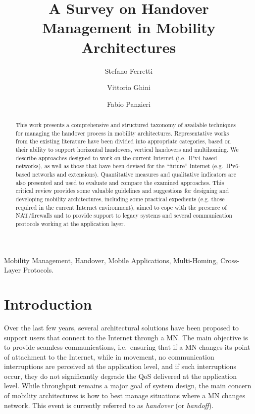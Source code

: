 \documentclass[preprint,12pt]{elsarticle}
\begin{document}
\begin{frontmatter}

\title{A Survey on Handover Management in Mobility Architectures}

\author{Stefano Ferretti}

\author{Vittorio Ghini}

\author{Fabio Panzieri}

\address{Department of Computer Science and Engineering, University of Bologna\\ Mura Anteo 
Zamboni 7, 40127 Bologna, Italy}

\begin{abstract}
This work presents a comprehensive and structured taxonomy of  available techniques for managing the handover process in mobility architectures. 
Representative works from the existing literature have been divided into appropriate categories, based on their ability to support horizontal handovers, vertical handovers and 
multihoming. We describe approaches designed to work on the current Internet (i.e.~IPv4-based 
networks), as well as those that have been devised for the ``future'' Internet 
(e.g.~IPv6-based networks and extensions). 
Quantitative measures and qualitative indicators are 
also presented and used to evaluate and compare the examined approaches.
This critical review provides some valuable guidelines and suggestions for designing and developing mobility architectures,  
including some practical expedients (e.g. those required in the current Internet environment), aimed to cope with the presence of NAT/firewalls and to provide support to legacy systems and several communication protocols working at the application layer.
\end{abstract}

\begin{keyword}
Mobility Management, Handover, Mobile Applications, Multi-Homing, Cross-Layer Protocols.
\end{keyword}

\end{frontmatter}

\section{Introduction}

Over the last few years, several architectural solutions have been proposed to support users that connect to the Internet through a \ac{MN}. 
The main objective is to provide seamless communications, 
i.e.~ensuring that if a \ac{MN} changes its point of attachment to the Internet, while in movement, no communication interruptions are perceived at the application 
level, and if such interruptions occur, they do not significantly degrade the 
\ac{QoS} delivered at the application level.  
While throughput remains a major goal of system design,
the main concern of mobility architectures is how to best manage situations where a MN changes network. This event is 
currently referred to as \textit{handover} (or \textit{handoff}).  
\end{document}
